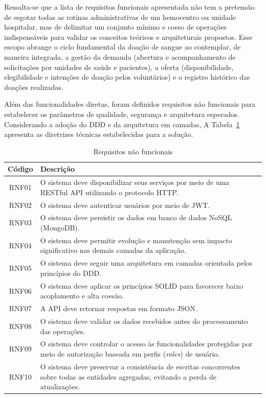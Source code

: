 Ressalta-se que a lista de requisitos funcionais apresentada não tem a pretensão de esgotar todas as rotinas administrativas de um hemocentro ou unidade hospitalar, mas de delimitar um conjunto mínimo e coeso de operações indispensáveis para validar os conceitos teóricos e arquiteturais propostos. Esse escopo abrange o ciclo fundamental da doação de sangue ao contemplar, de maneira integrada, a gestão da demanda (abertura e acompanhamento de solicitações por unidades de saúde e pacientes), a oferta (disponibilidade, elegibilidade e intenções de doação pelos voluntários) e o registro histórico das doações realizadas.


Além das funcionalidades diretas, foram definidos requisitos não funcionais para estabelecer os parâmetros de qualidade, segurança e arquitetura esperados. Considerando a adoção do DDD e da arquitetura em camadas, A Tabela~\ref{tab:rnf} apresenta as diretrizes técnicas estabelecidas para a solução.

\begin{table}[H]
  \centering
  \caption{Requisitos não funcionais}
  \label{tab:rnf}
  \small
  \begin{tabularx}{\textwidth}{c X}
    \toprule
    \textbf{Código} & \textbf{Descrição} \\
    \midrule
    RNF01 & O sistema deve disponibilizar seus serviços por meio de uma RESTful API utilizando o protocolo HTTP. \\
    RNF02 & O sistema deve autenticar usuários por meio de JWT. \\
    RNF03 & O sistema deve persistir os dados em banco de dados NoSQL (MongoDB). \\
    RNF04 & O sistema deve permitir evolução e manutenção sem impacto significativo nas demais camadas da aplicação. \\
    RNF05 & O sistema deve seguir uma arquitetura em camadas orientada pelos princípios do DDD. \\
    RNF06 & O sistema deve aplicar os princípios SOLID para favorecer baixo acoplamento e alta coesão. \\
    RNF07 & A API deve retornar respostas em formato JSON. \\
    RNF08 & O sistema deve validar os dados recebidos antes do processamento das operações. \\
    RNF09 & O sistema deve controlar o acesso às funcionalidades protegidas por meio de autorização baseada em perfis (\textit{roles}) de usuário. \\
    RNF10 & O sistema deve preservar a consistência de escritas concorrentes sobre todas as entidades agregadas, evitando a perda de atualizações. \\
    \bottomrule
  \end{tabularx}
\end{table}


